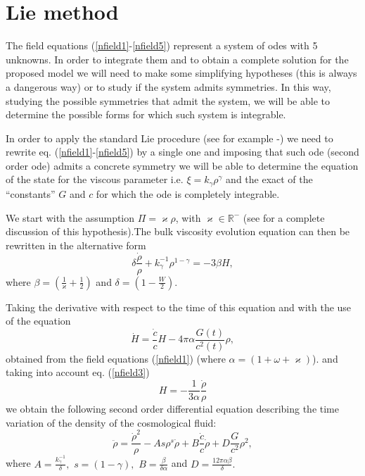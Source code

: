 \documentclass{revtex4}
\begin{document}
\section{Lie method\label{LIE}}

The field equations (\ref{nfield1}-\ref{nfield5}) represent a system of odes
with 5 unknowns. In order to integrate them and to obtain a complete
solution for the proposed model we will need to make some simplifying
hypotheses (this is always a dangerous way) or to study if the system admits
symmetries. In this way, studying the possible symmetries that admit the
system, we will be able to determine the possible forms for which such
system is integrable.

In order to apply the standard Lie procedure (see for example \cite{Ovsi}-\cite
{Blumann}) we need to rewrite eq. (\ref{nfield1}-\ref{nfield5}) by a single
one and imposing that such ode (second order ode) admits a concrete symmetry
we will be able to determine the equation of the state for the viscous
parameter i.e. $\xi =k_{\gamma }\rho ^{\gamma }$ and the exact of the
``constants'' $G$ and $c$ for which the ode is completely integrable.

We start with the assumption $\Pi =\varkappa \rho $, with $\varkappa \in
\mathbb{R}^{-}$ (see \cite{Tony2} for a complete discussion of this
hypothesis).The bulk viscosity evolution equation can then be rewritten in
the alternative form
\begin{equation}
\delta \frac{\dot{\rho}}{\rho }+k_{\gamma }^{-1}\rho ^{1-\gamma }=-3\beta H,
\end{equation}
where $\beta =\left( \frac{1}{\varkappa }+\frac{1}{2}\right) $ and $\delta
=\left( 1-\frac{W}{2}\right) .$

Taking the derivative with respect to the time of this equation and with the
use of the equation
\begin{equation}
\dot{H}=\frac{\dot{c}}{c}H-4\pi \alpha \frac{G(t)}{c^{2}(t)}\rho ,
\end{equation}
obtained from the field equations (\ref{nfield1}) (where $\alpha =\left(
1+\omega +\varkappa \right) $). and taking into account eq. (\ref{nfield3})
\begin{equation}
H=-\frac{1}{3\alpha }\frac{\dot{\rho}}{\rho }
\end{equation}
we obtain the following second order differential equation describing the
time variation of the density of the cosmological fluid:
\begin{equation}
\ddot{\rho}=\frac{\dot{\rho}^{2}}{\rho }-As\rho ^{s}\dot{\rho}+B\frac{\dot{c}%
}{c}\dot{\rho}+D\frac{G}{c^{2}}\rho ^{2},  \label{neweq}
\end{equation}
where $A=\frac{k_{\gamma }^{-1}}{\delta },$ $s=(1-\gamma ),$ $B=\frac{\beta
}{\delta \alpha }$ and $D=\frac{12\pi \alpha \beta }{\delta }.$
\end{document}
